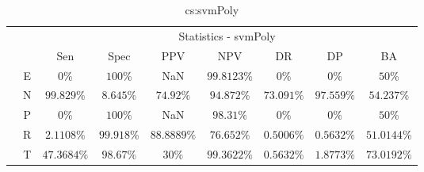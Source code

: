 \begin{table}[!ht]
	\centering
	\begin{tabular}{|c|c|c|c|c|c|c|c|c|}
		\cline{3-9}
		\multicolumn{2}{c|}{} & \multicolumn{7}{c|}{Statistics - svmPoly} \\ \cline{3-9}
		\multicolumn{2}{c|}{} & Sen & Spec & PPV & NPV & DR & DP & BA \\ \hline
		\multirow{5}{*}{\rotatebox{90}{Class}} & E & $0\%$ & $100\%$ & NaN & $99.8123\%$ & $0\%$ & $0\%$ & $50\%$ \\ \cline{2-9}
		 & N & $99.829\%$ & $8.645\%$ & $74.92\%$ & $94.872\%$ & $73.091\%$ & $97.559\%$ & $54.237\%$ \\ \cline{2-9}
		 & P & $0\%$ & $100\%$ & NaN & $98.31\%$ & $0\%$ & $0\%$ & $50\%$ \\ \cline{2-9}
		 & R & $2.1108\%$ & $99.918\%$ & $88.8889\%$ & $76.652\%$ & $0.5006\%$ & $0.5632\%$ & $51.0144\%$ \\ \cline{2-9}
		 & T & $47.3684\%$ & $98.67\%$ & $30\%$ & $99.3622\%$ & $0.5632\%$ & $1.8773\%$ & $73.0192\%$ \\ \hline
	\end{tabular}
	\caption{cs:svmPoly}
	\label{tab:cs:svmPoly}
\end{table}
